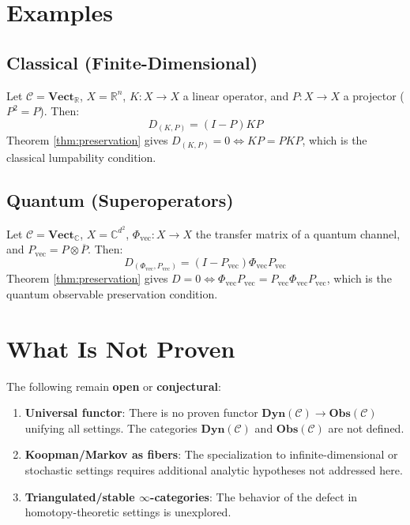 \documentclass[11pt,a4paper]{article}
\theoremstyle{definition}
\begin{document}
\section{Examples}

\subsection{Classical (Finite-Dimensional)}

Let $\mathcal{C} = \mathbf{Vect}_{\mathbb{R}}$, $X = \mathbb{R}^n$, $K: X \to X$ a linear operator, and $P: X \to X$ a projector ($P^2 = P$). Then:
\[
D_{(K,P)} = (I - P) K P
\]
Theorem \ref{thm:preservation} gives $D_{(K,P)} = 0 \iff KP = PKP$, which is the classical lumpability condition.

\subsection{Quantum (Superoperators)}

Let $\mathcal{C} = \mathbf{Vect}_{\mathbb{C}}$, $X = \mathbb{C}^{d^2}$, $\Phi_{\text{vec}}: X \to X$ the transfer matrix of a quantum channel, and $P_{\text{vec}} = P \otimes \overline{P}$. Then:
\[
D_{(\Phi_{\text{vec}}, P_{\text{vec}})} = (I - P_{\text{vec}}) \Phi_{\text{vec}} P_{\text{vec}}
\]
Theorem \ref{thm:preservation} gives $D = 0 \iff \Phi_{\text{vec}} P_{\text{vec}} = P_{\text{vec}} \Phi_{\text{vec}} P_{\text{vec}}$, which is the quantum observable preservation condition.

\section{What Is Not Proven}

The following remain \textbf{open} or \textbf{conjectural}:

\begin{enumerate}
\item \textbf{Universal functor}: There is no proven functor $\mathbf{Dyn}(\mathcal{C}) \to \mathbf{Obs}(\mathcal{C})$ unifying all settings. The categories $\mathbf{Dyn}(\mathcal{C})$ and $\mathbf{Obs}(\mathcal{C})$ are not defined.
\item \textbf{Koopman/Markov as fibers}: The specialization to infinite-dimensional or stochastic settings requires additional analytic hypotheses not addressed here.
\item \textbf{Triangulated/stable $\infty$-categories}: The behavior of the defect in homotopy-theoretic settings is unexplored.
\end{enumerate}
\end{document}
